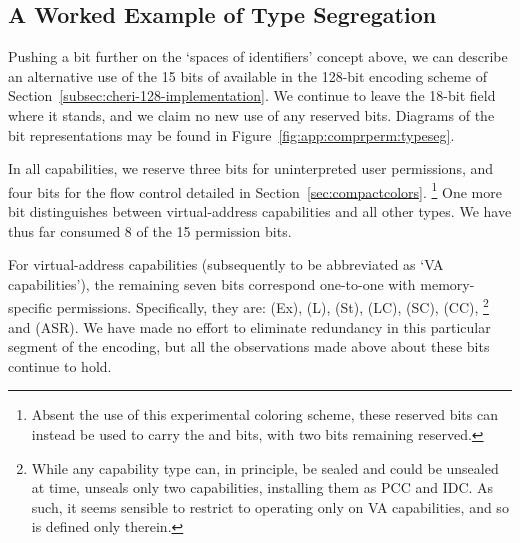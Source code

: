 \subsection{A Worked Example of Type Segregation} %

Pushing a bit further on the `spaces of identifiers' concept above, we can
describe an alternative use of the 15 bits of {\cmuperms} available in the
128-bit encoding scheme of Section~\ref{subsec:cheri-128-implementation}.  We
continue to leave the 18-bit \cotype{} field where it stands, and we claim no
new use of any reserved bits.  Diagrams of the bit representations may be found
in Figure~\ref{fig:app:comprperm:typeseg}.

In all capabilities, we reserve three bits for uninterpreted user
permissions, and four bits for the flow control detailed in
Section~\ref{sec:compactcolors}.%
%
\footnote{Absent the use of this experimental coloring scheme, these
reserved bits can instead be used to carry the \cappermG* and \cappermSLC*
bits, with two bits remaining reserved.}
%
One more bit distinguishes between virtual-address capabilities and all
other types.  We have thus far consumed 8 of the 15 permission bits.

For virtual-address capabilities
(subsequently to be abbreviated as `VA capabilities'),
the remaining seven bits correspond
one-to-one with memory-specific permissions.  Specifically, they are:
\cappermX* (Ex), \cappermL* (L), \cappermS* (St),
\cappermLC* (LC), \cappermSC* (SC), \cappermCInvoke* (CC),%
%
\footnote{While any capability type can, in principle, be sealed and could be
unsealed at  time,  unseals only two
capabilities, installing them as PCC and IDC.  As such, it seems sensible to
restrict  to operating only on VA capabilities, and so \cappermCInvoke is
defined only therein.}
%
and \cappermASR* (ASR).  We have made no effort to
eliminate redundancy in this particular segment of the encoding, but all the
observations made above about these bits continue to hold.

